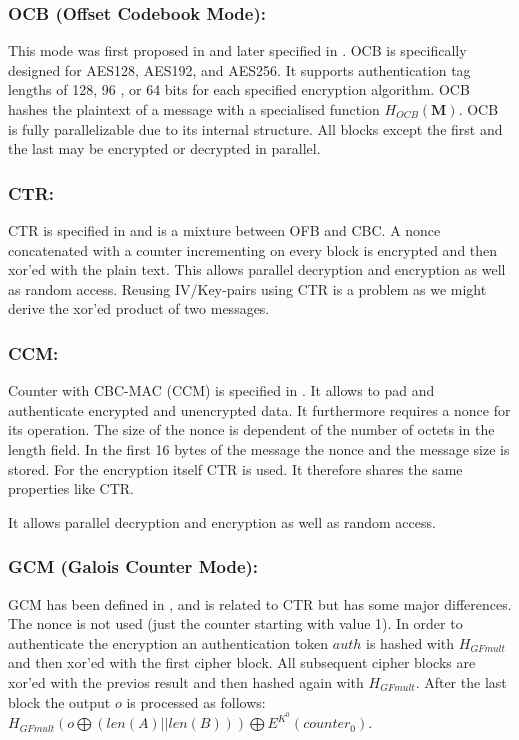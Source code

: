 \subsubsection{OCB (Offset Codebook Mode):} This mode was first proposed in \cite{rogaway2003ocb} and later specified in \cite{krovetz-ocb-04}. OCB is specifically designed for AES128, AES192, and AES256. It supports authentication tag lengths of 128, 96 , or 64 bits for each specified encryption algorithm. OCB hashes the plaintext of a message with a specialised function $H_{OCB}(\mathbf{M})$. OCB is fully parallelizable due to its internal structure. All blocks except the first and the last may be encrypted or decrypted in parallel.

\subsubsection{CTR:} CTR is specified in \cite{lipmaa2000ctr} and is a mixture between OFB and CBC. A nonce concatenated with a counter incrementing on every block is encrypted and then xor'ed with the plain text. This allows parallel decryption and encryption as well as random access. Reusing IV/Key-pairs using CTR is a problem as we might derive the xor'ed product of two messages.

\subsubsection{CCM:} Counter with CBC-MAC (CCM) is specified in \cite{RFC3610}. It allows to pad and authenticate encrypted and unencrypted data. It furthermore requires a nonce for its operation. The size of the nonce is dependent of the number of octets in the length field. In the first 16 bytes of the message the nonce and the message size is stored. For the encryption itself CTR is used. It therefore shares the same properties like CTR. 

It allows parallel decryption and encryption as well as random access.

\subsubsection{GCM (Galois Counter Mode):} GCM has been defined in \cite{mcgrew2004galois}, and is related to CTR but has some major differences. The nonce is not used (just the counter starting with value 1). In order to authenticate the encryption an authentication token $auth$ is hashed with $H_{GFmult}$ and then xor'ed with the first cipher block. All subsequent cipher blocks are xor'ed with the previos result and then hashed  again with $H_{GFmult}$. After the last block the output $o$ is processed  as follows: $H_{GFmult}(o\bigoplus (len(A)||len(B))) \bigoplus E^{K^0}(counter_0)$. 

